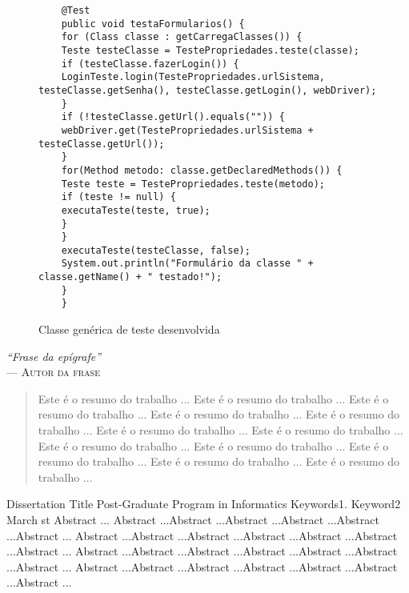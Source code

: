 \documentclass[tg]{mdtufsm}
\begin{document}
\begin{figure}[!htb]
	\begin{lstlisting}
	@Test
	public void testaFormularios() {
	for (Class classe : getCarregaClasses()) {
	Teste testeClasse = TestePropriedades.teste(classe);
	if (testeClasse.fazerLogin()) {
	LoginTeste.login(TestePropriedades.urlSistema, testeClasse.getSenha(), testeClasse.getLogin(), webDriver);
	}
	if (!testeClasse.getUrl().equals("")) {
	webDriver.get(TestePropriedades.urlSistema + testeClasse.getUrl());
	}
	for(Method metodo: classe.getDeclaredMethods()) {
	Teste teste = TestePropriedades.teste(metodo);
	if (teste != null) {
	executaTeste(teste, true);
	}
	}
	executaTeste(testeClasse, false);
	System.out.println("Formulário da classe " + classe.getName() + " testado!");
	}
	}
	\end{lstlisting}
	\caption{Classe genérica de teste desenvolvida}
	\label{code:TestaFormularios.java}
\end{figure}


\clearpage
\begin{flushright}
\mbox{}\vfill
{\sffamily\itshape
``Frase da epígrafe'' \\ }
--- \textsc{Autor da frase}
\end{flushright}


\begin{abstract}
Este é o resumo do trabalho ... Este é o resumo do trabalho ...
Este é o resumo do trabalho ... Este é o resumo do trabalho ...
Este é o resumo do trabalho ... Este é o resumo do trabalho ...
Este é o resumo do trabalho ... Este é o resumo do trabalho ...
Este é o resumo do trabalho ... Este é o resumo do trabalho ...
Este é o resumo do trabalho ... Este é o resumo do trabalho ...
\end{abstract}

\begin{englishabstract}
{Dissertation Title}
{Post-Graduate Program in Informatics}
{Keywords1. Keyword2}
{March}
{st}
Abstract ... Abstract ...Abstract ...Abstract ...Abstract ...Abstract ...Abstract ...
Abstract ...Abstract ...Abstract ...Abstract ...Abstract ...Abstract ...Abstract ...
Abstract ...Abstract ...Abstract ...Abstract ...Abstract ...Abstract ...Abstract ...
Abstract ...Abstract ...Abstract ...Abstract ...Abstract ...Abstract ...Abstract ...
\end{englishabstract}
\end{document}
